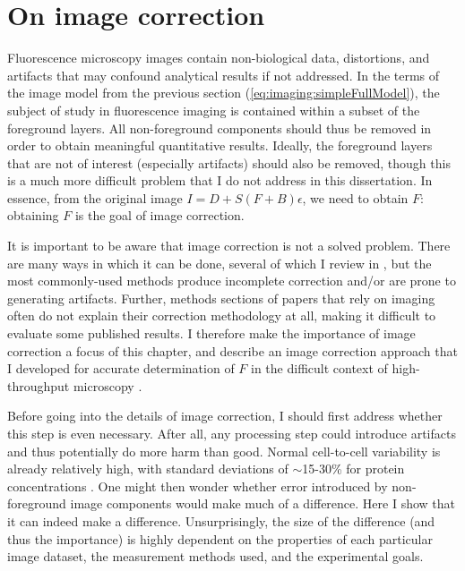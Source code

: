 \section{On image correction}
\label{imaging:correction}

Fluorescence microscopy images contain non-biological data,
distortions, and artifacts that may confound analytical results if
not addressed.
In the terms of the image model from the previous section
(\ref{eq:imaging:simpleFullModel}), the
subject of study in fluorescence imaging is contained within a subset of the
foreground layers. All non-foreground components should thus
be removed in order to obtain meaningful quantitative results.
Ideally, the foreground layers that are not of interest (especially
artifacts) should also be removed, though this is a much more difficult
problem that I do not address in this dissertation.
In essence, from the original image $I=D+S(F+B)\epsilon$, we need to
obtain $F$: obtaining $F$ is the goal of image correction.


It is important to be aware that image correction is not a solved
problem. There are many ways in which it can be done, several of which I review
in , but the most commonly-used methods produce
incomplete correction and/or are prone
to generating artifacts. Further, methods sections of papers that
rely on imaging often do not explain their correction methodology
at all, making it difficult to evaluate some published results.
I therefore make the importance of image correction a focus
of this chapter, and describe an image correction
approach that I developed for accurate determination of $F$
in the difficult context of high-throughput microscopy
 \cite{Coster2014}.


Before going into the details of image correction, I should
first address whether this step is even necessary.
After all, any processing step
could introduce artifacts and thus potentially do more harm than good.
Normal cell-to-cell variability is already relatively high,
with standard deviations of 
$\sim$15-30\% for protein concentrations \cite{Sigal2006a}. One might then
wonder whether error introduced by non-foreground image components
would make much of a difference. Here I show that it can
indeed make a difference. Unsurprisingly,
the size of the difference (and thus the importance) is highly
dependent on the properties of each particular image dataset,
the measurement methods used, and the experimental goals.


